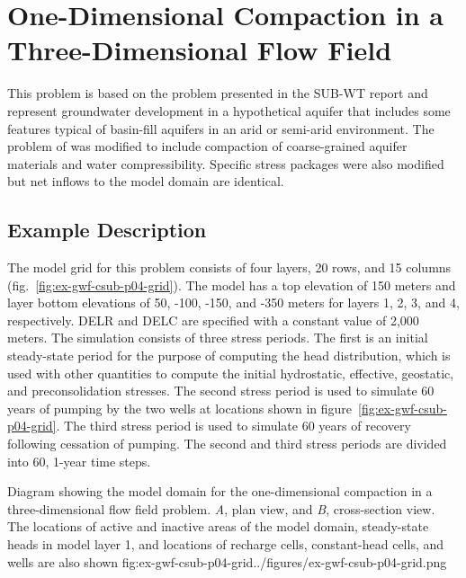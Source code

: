 \section{One-Dimensional Compaction in a Three-Dimensional Flow Field}

This problem is based on the problem presented in the SUB-WT report \citep{leake2007modflow} and represent groundwater development in a hypothetical aquifer that includes some features typical of basin-fill aquifers in an arid or semi-arid environment. The problem of \cite{leake2007modflow} was modified to include compaction of coarse-grained aquifer materials and water compressibility. Specific stress packages were also modified but net inflows to the model domain are identical.

\subsection{Example Description}

The model grid for this problem consists of four layers, 20 rows, and 15 columns (fig.~\ref{fig:ex-gwf-csub-p04-grid}).  The model has a top elevation of 150 meters and layer bottom elevations of 50, -100, -150, and -350 meters for layers 1, 2, 3, and 4, respectively.  DELR and DELC are specified with a constant value of 2,000 meters. The simulation consists of three stress periods. The first is an initial steady-state period for the purpose of computing the head distribution, which is used with other quantities to compute the initial hydrostatic, effective, geostatic, and preconsolidation stresses. The second stress period is used to simulate 60 years of pumping by the two wells at locations shown in figure~\ref{fig:ex-gwf-csub-p04-grid}. The third stress period is used to simulate 60 years of recovery following cessation of pumping. The second and third stress periods are divided into 60, 1-year time steps.

\begin{StandardFigure}{
                                     Diagram showing the model domain for the one-dimensional compaction in a 
                                     three-dimensional flow field problem. \textit{A}, plan view, and \textit{B}, cross-section 
                                     view. The locations of active and inactive areas of the model domain, steady-state 
                                     heads in model layer 1, and locations of recharge cells, constant-head cells, 
                                     and wells are also shown
                                     }{fig:ex-gwf-csub-p04-grid}{../figures/ex-gwf-csub-p04-grid.png}
\end{StandardFigure}                                 

